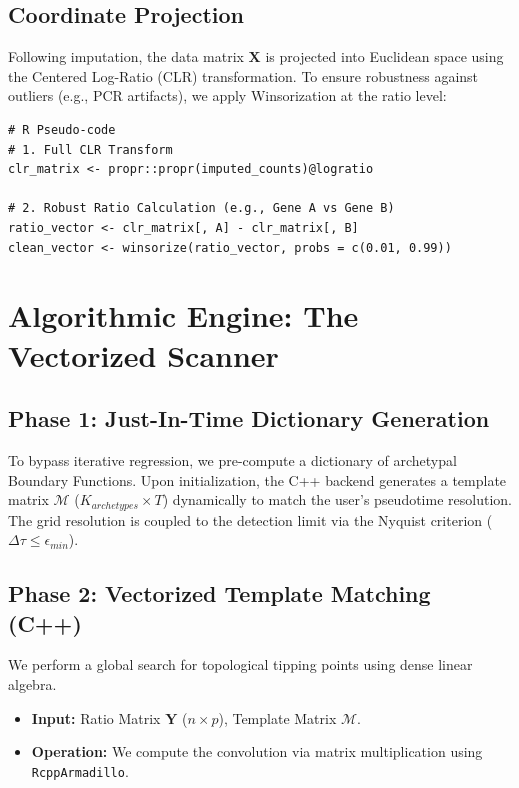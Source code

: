 \documentclass[11pt, a4paper]{article}
\begin{document}
\subsection{Coordinate Projection}
Following imputation, the data matrix $\mathbf{X}$ is projected into Euclidean space using the Centered Log-Ratio (CLR) transformation. To ensure robustness against outliers (e.g., PCR artifacts), we apply Winsorization at the ratio level:

\begin{lstlisting}
# R Pseudo-code
# 1. Full CLR Transform
clr_matrix <- propr::propr(imputed_counts)@logratio

# 2. Robust Ratio Calculation (e.g., Gene A vs Gene B)
ratio_vector <- clr_matrix[, A] - clr_matrix[, B]
clean_vector <- winsorize(ratio_vector, probs = c(0.01, 0.99))
\end{lstlisting}

\section{Algorithmic Engine: The Vectorized Scanner}

\subsection{Phase 1: Just-In-Time Dictionary Generation}
To bypass iterative regression, we pre-compute a dictionary of archetypal Boundary Functions. Upon initialization, the C++ backend generates a template matrix $\mathcal{M}$ ($K_{archetypes} \times T$) dynamically to match the user's pseudotime resolution. The grid resolution is coupled to the detection limit via the Nyquist criterion ($\Delta\tau \le \epsilon_{min}$).

\subsection{Phase 2: Vectorized Template Matching (C++)}
We perform a global search for topological tipping points using dense linear algebra.

\begin{itemize}
    \item \textbf{Input:} Ratio Matrix $\mathbf{Y}$ ($n \times p$), Template Matrix $\mathcal{M}$.
    \item \textbf{Operation:} We compute the convolution via matrix multiplication using \texttt{RcppArmadillo}.
\end{itemize}
\end{document}
